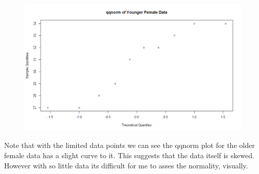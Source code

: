 \documentclass[12pt]{article}
\makeatletter
\theoremstyle{homework}
\newenvironment{exercise}[1]
{\def\@currentlabel{#1}\exercisecore}
{\endexercisecore}
\makeatother
\begin{document}
\begin{exercise}{9.28}
\begin{figure}[H]
  \includegraphics[width = \textwidth]{YF.png}  
  \centering
\end{figure} 
\end{exercise}

Note that with the limited data points we can see the qqnorm plot for the older female data has a slight curve to it. This suggests that 
the data itself is skewed. However with so little data its difficult for me to asses the normality, visually. 
\vspace{.5in}
\end{document}
